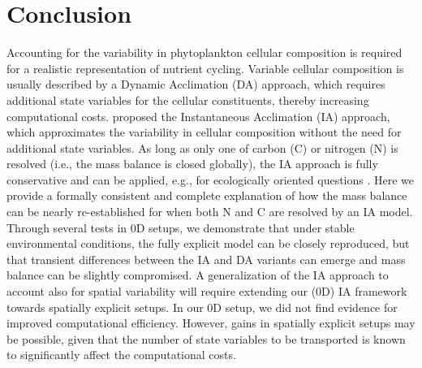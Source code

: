 \documentclass[gmd, manuscript]{copernicus}
\begin{document}
\section{Conclusion}
Accounting for the variability in phytoplankton cellular composition is required for a realistic representation of nutrient cycling.  Variable cellular composition is usually described by a Dynamic Acclimation (DA) approach, which requires additional state variables for the cellular constituents, thereby increasing computational costs. \citet{Smith2016} proposed the Instantaneous Acclimation (IA) approach, which approximates the variability in cellular composition without the need for additional state variables. As long as only one of carbon (C) or nitrogen (N) is resolved (i.e., the mass balance is closed globally), the IA approach is fully conservative and can be applied, e.g., for ecologically oriented questions \citep[e.g.][]{Kerimoglu2021}. Here we provide a formally consistent and complete explanation of how the mass balance can be nearly re-established for when both N and C are resolved by an IA model. Through several tests in 0D setups, we demonstrate that under stable environmental conditions, the fully explicit model can be closely reproduced, but that transient differences between the IA and DA variants can emerge and mass balance can be slightly compromised. A generalization of the IA approach to account also for spatial variability will require extending our (0D) IA framework towards spatially explicit setups. In our 0D setup, we did not find evidence for improved computational efficiency.  However, gains in spatially explicit setups may be possible, given that the number of state variables to be transported is known to significantly affect the computational costs.


\end{document}
